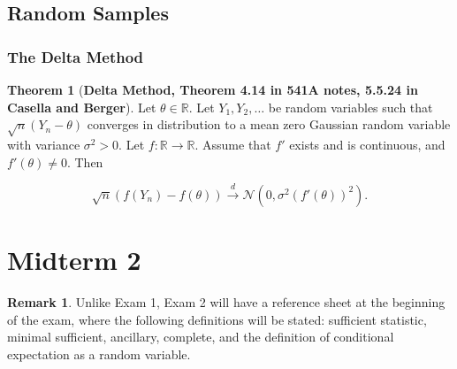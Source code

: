 \documentclass{article}
\theoremstyle{definition}
\newtheorem{theorem}{Theorem}
\theoremstyle{definition}
\theoremstyle{definition}
\theoremstyle{definition}
\theoremstyle{definition}
\newtheorem*{remark}{Remark}
\theoremstyle{definition}
\theoremstyle{definition}
\begin{document}
\subsection{Random Samples}

\subsubsection{The Delta Method}

\begin{theorem}[\textbf{Delta Method, Theorem 4.14 in 541A notes, 5.5.24 in Casella and Berger}]\label{mathstats.delta.method.thm} Let \(\theta \in \mathbb{R}\). Let \(Y_1, Y_2, \ldots\) be random variables such that \(\sqrt{n}(Y_n - \theta)\) converges in distribution to a mean zero Gaussian random variable with variance \(\sigma^2 > 0\). Let \(f: \mathbb{R} \to \mathbb{R}\). Assume that \(f'\) exists and is continuous, and \(f'(\theta) \neq 0\). Then

\[
\sqrt{n}(f(Y_n) - f(\theta)) \xrightarrow{d} \mathcal{N}(0, \sigma^2(f'(\theta))^2).
\]


\end{theorem}

%
%
%







\section{Midterm 2}



\begin{remark}Unlike Exam 1, Exam 2 will have a reference sheet at the beginning of the exam, where the following definitions will be stated: sufficient statistic, minimal sufficient, ancillary, complete, and the definition of conditional expectation as a random variable.

\end{remark}
\end{document}
